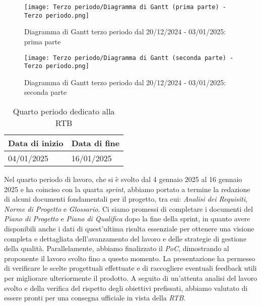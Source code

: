 \newpage
\begin{figure}[h] 
    \centering
    \texttt{[image: Terzo periodo/Diagramma di Gantt (prima parte) - Terzo periodo.png]}
    \caption{Diagramma di Gantt terzo periodo dal 20/12/2024 - 03/01/2025: prima parte} 
    \label{fig: Diagramma di Gantt terzo periodo dal 20/12/2024 - 03/01/2025: prima parte}
\end{figure}

\newpage
\begin{figure}[h] 
    \centering
    \texttt{[image: Terzo periodo/Diagramma di Gantt (seconda parte) - Terzo periodo.png]}
    \caption{Diagramma di Gantt terzo periodo dal 20/12/2024 - 03/01/2025: seconda parte} 
    \label{fig: Diagramma di Gantt terzo periodo dal 20/12/2024 - 03/01/2025: seconda parte}
\end{figure}

\newpage
{}
\label{sec:quarto periodo}
\begin{table}[h!]
    \centering
    \renewcommand{\arraystretch}{1.5} %
    \begin{tabularx}{\textwidth}{|X|X|}\hline
    \rowcolor[HTML]{FFD700} 
    \textbf{Data di inizio} & \textbf{Data di fine} \\ \hline
    04/01/2025 & 16/01/2025 \\ \hline
    \end{tabularx}
    \caption{Quarto periodo dedicato alla RTB}
\end{table}
Nel quarto periodo di lavoro, che si è svolto dal 4 gennaio 2025 al 16 gennaio 2025 e ha coinciso con la quarta \textit{sprint}, abbiamo portato a termine la redazione di alcuni documenti fondamentali per il progetto, tra cui: \emph{Analisi dei Requisiti}, \emph{Norme di Progetto} e \emph{Glossario}. 
Ci siamo promessi di completare i documenti del \emph{Piano di Progetto} e \emph{Piano di Qualifica} dopo la fine della sprint, in quanto avere disponibili anche i dati di quest'ultima risulta essenziale per ottenere una visione completa e dettagliata dell'avanzamento del lavoro e delle strategie di gestione della qualità.  
Parallelamente, abbiamo finalizzato il \emph{PoC}, dimostrando al proponente il lavoro svolto fino a questo momento. La presentazione ha permesso di verificare le scelte progettuali effettuate e di raccogliere eventuali feedback utili per migliorare ulteriormente il prodotto.
A seguito di un'attenta analisi del lavoro svolto e della verifica del rispetto degli obiettivi prefissati, abbiamo valutato di essere pronti per una consegna ufficiale in vista della \emph{RTB}.

